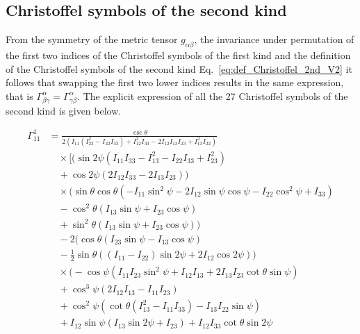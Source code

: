 \documentclass[lineno, pdflatex,sn-mathphys-ay]{sn-jnl}
\theoremstyle{thmstyleone}%
\theoremstyle{thmstyletwo}%
\theoremstyle{thmstylethree}%
\begin{document}
\begin{appendices}
\subsection{Christoffel symbols of the second kind}

From the symmetry of the metric tensor $g_{\alpha\beta}$, the invariance under permutation of the first two indices of the Christoffel symbols of the first kind and the definition of the Christoffel symbols of the second kind Eq.~\eqref{eq:def_Christoffel_2nd_V2} it follows that swapping the first two lower indices results in the same expression, that is
${\Gamma^{\alpha}_{\beta\gamma} = \Gamma^{\alpha}_{\gamma\beta} }$.
The explicit expression of all the 27 Christoffel symbols of the second kind is given below.

\allowdisplaybreaks
\begin{align}
    \Gamma^{1}_{11} &= \frac{\csc \theta}{2 \left(I_{11} \left(I_{23}^2-I_{22} I_{33}\right)+I_{12}^2 I_{33}-2 I_{12} I_{13} I_{23}+I_{13}^2 I_{22}\right)} \nonumber \\
    &\quad \times \bigg[ \Big(\sin 2\psi \left(I_{11} I_{33}-I_{13}^2-I_{22} I_{33}+I_{23}^2\right) \nonumber \\
    &\quad + \cos 2\psi (2 I_{12} I_{33}-2 I_{13} I_{23})\Big) \nonumber \\
    &\quad \times \bigg(\sin \theta \cos \theta \left(-I_{11} \sin ^2\psi-2 I_{12} \sin \psi \cos \psi-I_{22} \cos ^2\psi+I_{33}\right) \nonumber \\
    &\quad -\cos ^2\theta (I_{13} \sin \psi+I_{23} \cos \psi) \nonumber \\
    &\quad +\sin ^2\theta (I_{13} \sin \psi+I_{23} \cos \psi)\bigg) \nonumber \\
    &\quad -2 \bigg(\cos \theta (I_{23} \sin \psi-I_{13} \cos \psi) \nonumber \\
    &\quad -\frac{1}{2} \sin \theta ((I_{11}-I_{22}) \sin 2\psi+2 I_{12} \cos 2\psi)\bigg) \nonumber \\
    &\quad \times \bigg(-\cos \psi \left(I_{11} I_{23} \sin ^2\psi+I_{12} I_{13}+2 I_{13} I_{23} \cot \theta \sin \psi\right) \nonumber \\
    &\quad +\cos ^3\psi (2 I_{12} I_{13}-I_{11} I_{23}) \nonumber \\
    &\quad +\cos ^2\psi \left(\cot \theta \left(I_{13}^2-I_{11} I_{33}\right)-I_{13} I_{22} \sin \psi\right) \nonumber \\
    &\quad +I_{12} \sin \psi (I_{13} \sin 2\psi+I_{23}) +I_{12} I_{33} \cot \theta \sin 2\psi \nonumber \\

\end{align}
\end{appendices}
\end{document}
